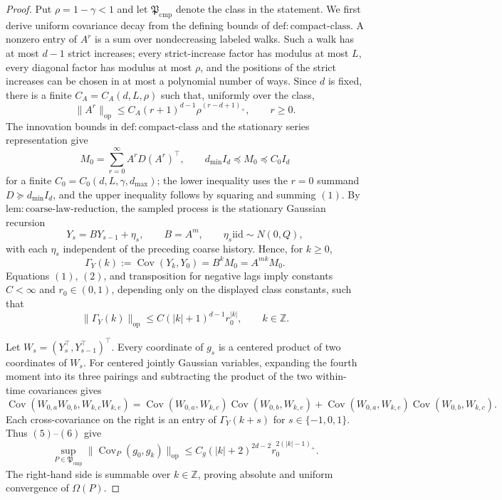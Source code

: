 \documentclass{article}
\begin{document}
\begin{proof}
Put \(\rho=1-\gamma<1\) and let \(\mathfrak P_{\mathrm{cmp}}\) denote the class in the statement.  We first derive uniform covariance decay from the defining bounds of \(\mathrm{def{:}compact\mbox{-}class}\).  A nonzero entry of \(A^r\) is a sum over nondecreasing labeled walks.  Such a walk has at most \(d-1\) strict increases; every strict-increase factor has modulus at most \(L\), every diagonal factor has modulus at most \(\rho\), and the positions of the strict increases can be chosen in at most a polynomial number of ways.  Since \(d\) is fixed, there is a finite \(C_A=C_A(d,L,\rho)\) such that, uniformly over the class,
\[
 \lVert A^r\rVert_{\mathrm{op}}
 \le C_A(r+1)^{d-1}\rho^{(r-d+1)_+},
 \qquad r\ge0.                                             \tag{1}
\]
The innovation bounds in \(\mathrm{def{:}compact\mbox{-}class}\) and the stationary series representation give
\[
 M_0=\sum_{r=0}^{\infty}A^rD(A^r)^\top,
 \qquad
 d_{\min}I_d\preceq M_0\preceq C_0I_d                    \tag{2}
\]
for a finite \(C_0=C_0(d,L,\gamma,d_{\max})\); the lower inequality uses the \(r=0\) summand \(D\succeq d_{\min}I_d\), and the upper inequality follows by squaring and summing \((1)\).  By \(\mathrm{lem{:}coarse\mbox{-}law\mbox{-}reduction}\), the sampled process is the stationary Gaussian recursion
\[
 Y_s=BY_{s-1}+\eta_s,
 \qquad B=A^m,
 \qquad \eta_s\mathrel{\mathrm{iid}}\sim N(0,Q),           \tag{3}
\]
with each \(\eta_s\) independent of the preceding coarse history.  Hence, for \(k\ge0\),
\[
 \Gamma_Y(k):=\operatorname{Cov}(Y_k,Y_0)=B^kM_0=A^{mk}M_0. \tag{4}
\]
Equations \((1)\), \((2)\), and transposition for negative lags imply constants \(C<\infty\) and \(r_0\in(0,1)\), depending only on the displayed class constants, such that
\[
 \lVert\Gamma_Y(k)\rVert_{\mathrm{op}}
 \le C(|k|+1)^{d-1}r_0^{|k|},
 \qquad k\in\mathbb Z.                                    \tag{5}
\]

Let \(W_s=(Y_s^\top,Y_{s-1}^\top)^\top\).  Every coordinate of \(g_s\) is a centered product of two coordinates of \(W_s\).  For centered jointly Gaussian variables, expanding the fourth moment into its three pairings and subtracting the product of the two within-time covariances gives
\[
 \operatorname{Cov}(W_{0,a}W_{0,b},W_{k,c}W_{k,e})
 =\operatorname{Cov}(W_{0,a},W_{k,c})
  \operatorname{Cov}(W_{0,b},W_{k,e})
 +\operatorname{Cov}(W_{0,a},W_{k,e})
  \operatorname{Cov}(W_{0,b},W_{k,c}).                     \tag{6}
\]
Each cross-covariance on the right is an entry of \(\Gamma_Y(k+s)\) for \(s\in\{-1,0,1\}\).  Thus \((5)\)--\((6)\) give
\[
 \sup_{P\in\mathfrak P_{\mathrm{cmp}}}
 \lVert\operatorname{Cov}_P(g_0,g_k)\rVert_{\mathrm{op}}
 \le C_g(|k|+2)^{2d-2}r_0^{2(|k|-1)_+}.                   \tag{7}
\]
The right-hand side is summable over \(k\in\mathbb Z\), proving absolute and uniform convergence of \(\Omega(P)\).


\end{proof}
\end{document}
